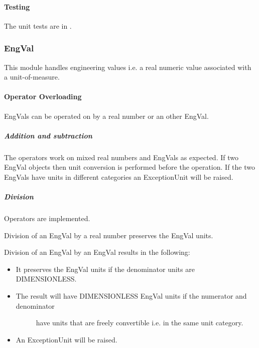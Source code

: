 \documentclass[letterpaper,10pt,english]{sphinxmanual}
\begin{document}
\paragraph{Testing}
\label{\detokenize{ref/LIS/core/Units:testing}}
The unit tests are in .


\subsubsection{EngVal}
\label{\detokenize{ref/LIS/core/EngVal:engval}}\label{\detokenize{ref/LIS/core/EngVal::doc}}\label{\detokenize{ref/LIS/core/EngVal:module-TotalDepth.LIS.core.EngVal}}
This module handles engineering values i.e. a real numeric value
associated with a unit-of-measure.


\paragraph{Operator Overloading}
\label{\detokenize{ref/LIS/core/EngVal:operator-overloading}}
EngVals can be operated on by a real number or an other EngVal.


\subparagraph{Addition and subtraction}
\label{\detokenize{ref/LIS/core/EngVal:addition-and-subtraction}}
The operators \sphinxcode{+, -, +=, -=} work on mixed real numbers and EngVals as expected.
If two EngVal objects then unit conversion is performed before the operation.
If the two EngVals have units in different categories an ExceptionUnit will be raised.


\subparagraph{Division}
\label{\detokenize{ref/LIS/core/EngVal:division}}
Operators \sphinxcode{/, /=} are implemented.

Division of an EngVal by a real number preserves the EngVal units.

Division of an EngVal by an EngVal results in the following:
\begin{itemize}
\item {} 
It preserves the EngVal units if the denominator units are DIMENSIONLESS.

\item {} \begin{description}
\item[{The result will have DIMENSIONLESS EngVal units if the numerator and denominator}] \leavevmode
have units that are freely convertible i.e. in the same unit category.

\end{description}

\item {} 
An ExceptionUnit will be raised.

\end{itemize}
\end{document}
